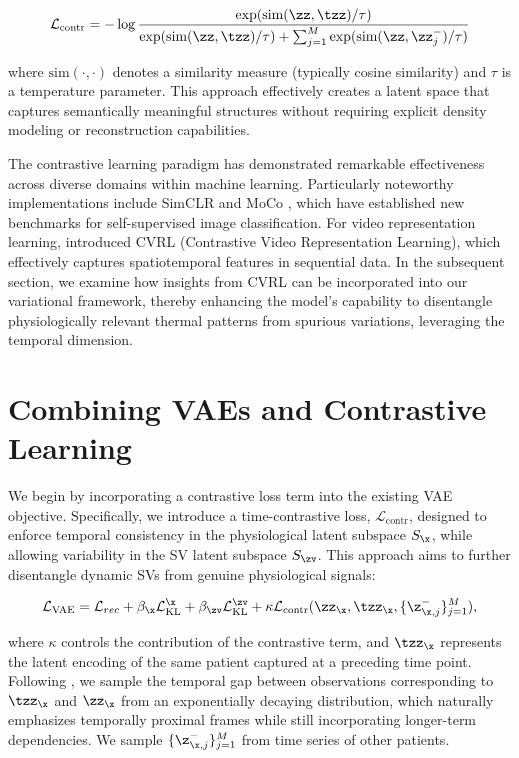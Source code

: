 \begin{equation}
  \mathcal{L}_{\text{contr}} = -\log \frac{\exp(\text{sim}(\zz, \tzz)/\tau)}{\exp(\text{sim}(\zz, \tzz)/\tau) + \sum_{j=1}^{M} \exp(\text{sim}(\zz, \zz^-_j)/\tau)}
\end{equation}

where $\text{sim}(\cdot,\cdot)$ denotes a similarity measure (typically cosine similarity) and $\tau$ is a temperature parameter. This approach effectively creates a latent space that captures semantically meaningful structures without requiring explicit density modeling or reconstruction capabilities.

The contrastive learning paradigm has demonstrated remarkable effectiveness across diverse domains within machine learning. Particularly noteworthy implementations include SimCLR \citep{chen2020simple} and MoCo \citep{he2020momentum}, which have established new benchmarks for self-supervised image classification. For video representation learning, \citet{qian2021spatiotemporal} introduced CVRL (Contrastive Video Representation Learning), which effectively captures spatiotemporal features in sequential data. In the subsequent section, we examine how insights from CVRL can be incorporated into our variational framework, thereby enhancing the model's capability to disentangle physiologically relevant thermal patterns from spurious variations, leveraging the temporal dimension.


\section{Combining VAEs and Contrastive Learning}

We begin by incorporating a contrastive loss term into the existing VAE objective. Specifically, we introduce a time-contrastive loss, \(\mathcal{L}_{\text{contr}}\), designed to enforce temporal consistency in the physiological latent subspace \(S_{\x}\), while allowing variability in the SV latent subspace \(S_{\zv}\). This approach aims to further disentangle dynamic SVs from genuine physiological signals:

\begin{equation}
  \mathcal{L}_{\text{VAE}} = \mathcal{L}_{rec} + \beta_{\x}\mathcal{L}_{\text{KL}}^{\x} + \beta_{\zv} \mathcal{L}_{\text{KL}}^{\zv} + \kappa\mathcal{L}_{\text{contr}}(\zz_{\x}, \tzz_{\x}, \{\z_{\x,j}^-\}_{j=1}^M),
\end{equation}

where $\kappa$ controls the contribution of the contrastive term, and \(\tzz_{\x}\) represents the latent encoding of the same patient captured at a preceding time point. Following \citet{qian2021spatiotemporal}, we sample the temporal gap between observations corresponding to \(\tzz_{\x}\) and \(\zz_{\x}\) from an exponentially decaying distribution, which naturally emphasizes temporally proximal frames while still incorporating longer-term dependencies. We sample $\{\z_{\x,j}^-\}_{j=1}^M$ from time series of other patients.

